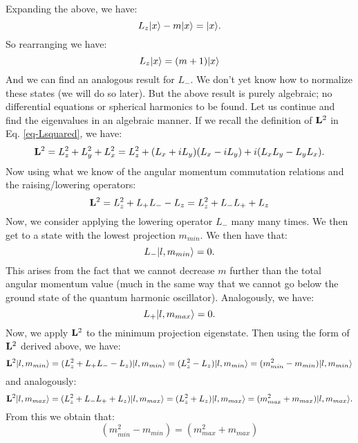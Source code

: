 Expanding the above, we have:
\begin{equation}
    L_z\lvert x \rangle - m\lvert x \rangle = \lvert x \rangle.
\end{equation}
So rearranging we have:
\begin{equation}
    L_z\lvert x \rangle = (m+1)\lvert x \rangle
\end{equation}
And we can find an analogous result for $L_-$. We don't yet know how to normalize these states (we will do so later). But the above result is purely algebraic; no differential equations or spherical harmonics to be found. Let us continue and find the eigenvalues in an algebraic manner. If we recall the definition of $\mathbf{L}^2$ in Eq. \eqref{eq-Lsquared}, we have:
\begin{equation}
    \mathbf{L}^2 = L_z^2 + L_y^2 + L_x^2 = L_z^2 + (L_x + iL_y)(L_x - iL_y) + i(L_xL_y - L_yL_x). 
\end{equation}
Now using what we know of the angular momentum commutation relations and the raising/lowering operators:
\begin{equation}
    \mathbf{L}^2 = L_z^2 + L_+L_- - L_z = L_z^2 + L_-L_+ + L_z
\end{equation}
Now, we consider applying the lowering operator $L_-$ many many times. We then get to a state with the lowest projection $m_{min}$. We then have that:
\begin{equation}
    L_-\lvert l, m_{min} \rangle = 0.
\end{equation}
This arises from the fact that we cannot decrease $m$ further than the total angular momentum value (much in the same way that we cannot go below the ground state of the quantum harmonic oscillator). Analogously, we have:
\begin{equation}
    L_+\lvert l, m_{max} \rangle = 0.
\end{equation}
Now, we apply $\mathbf{L}^2$ to the minimum projection eigenstate. Then using the form of $\mathbf{L}^2$ derived above, we have:
\begin{equation}
    \mathbf{L}^2\lvert l, m_{min} \rangle = (L_z^2 + L_+L_- - L_z)\lvert l, m_{min} \rangle  = (L_z^2 - L_z)\lvert l, m_{min} \rangle = (m^2_{min} - m_{min})\lvert l, m_{min} \rangle
\end{equation}
and analogously:
\begin{equation}
    \mathbf{L}^2\lvert l, m_{max} \rangle = (L_z^2 + L_-L_+ + L_z)\lvert l, m_{max} \rangle  = (L_z^2 + L_z)\lvert l, m_{max} \rangle = (m^2_{max} + m_{max})\lvert l, m_{max} \rangle.
\end{equation}
From this we obtain that:
\begin{equation}
    (m^2_{min} - m_{min}) = (m^2_{max} + m_{max})
\end{equation}
